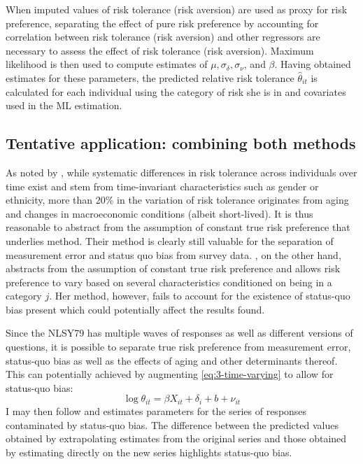 \documentclass[]{article}
\begin{document}
When imputed values of risk tolerance (risk aversion) are used as proxy for risk preference, separating the effect of pure risk preference by accounting for correlation between risk tolerance (risk aversion) and other regressors are necessary to assess the effect of risk tolerance (risk aversion). Maximum likelihood is then used to compute estimates of $\mu, \sigma_\delta, \sigma_\nu$, and $\beta$. Having obtained estimates for these parameters, the predicted relative risk tolerance $\hat\theta_{it}$ is calculated for each individual using the category of risk she is in and covariates used in the ML estimation. 
	
	
\subsection{Tentative application: combining both methods}	
As noted by \citet{sahm2012much}, while systematic differences in risk tolerance across individuals over time exist and stem from time-invariant characteristics such as gender or ethnicity, more than 20\% in the variation of risk tolerance originates from aging and changes in macroeconomic conditions (albeit short-lived). It is thus reasonable to abstract from the assumption of constant true risk preference that underlies \citet{kimball2008imputing, kimball2009risk} method. Their method is clearly still valuable for the separation of measurement error and status quo bias from survey data. \citet{ahn2010attitudes}, on the other hand, abstracts from the assumption of constant true risk preference and allows risk preference to vary based on several characteristics conditioned on being in a category $j$. Her method, however, fails to account for the existence of status-quo bias present which could potentially affect the results found. 

Since the NLSY79 has multiple waves of responses as well as different versions of questions, it is possible to separate true risk preference from measurement error, status-quo bias as well as the effects of aging and other determinants thereof. This can potentially achieved by augmenting \eqref{eq:3-time-varying} to allow for status-quo bias:
\begin{equation}
	\log \theta_{it}=\beta X_{it} + \delta_i+ b +\nu_{it}
	\label{eq:5-all-encompassing}
\end{equation} 
I may then follow \citet{ahn2010attitudes} and estimates parameters for the series of responses contaminated by status-quo bias. The difference between the predicted values obtained by extrapolating estimates from the original series and those obtained by estimating directly on the new series highlights status-quo bias. 	

	


	
\end{document}
